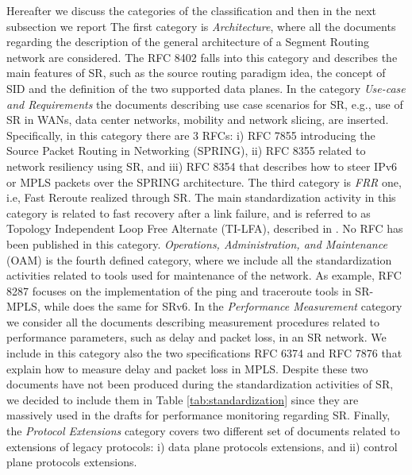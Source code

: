Hereafter we discuss the categories of the classification and then in the next subsection we report 
The first category is \textit{Architecture}, where all the documents regarding the description of the general architecture of a Segment Routing network are considered. The RFC 8402 \cite{rfc8402} falls into this category and describes the main features of SR, such as the source routing paradigm idea, the concept of SID and the definition of the two supported data planes.
In the category \textit{Use-case and Requirements} the documents describing use case scenarios for SR, e.g., use of SR in WANs, data center networks, mobility and network slicing, are inserted. Specifically, in this category there are 3 RFCs: i) RFC 7855 \cite{rfc7855} introducing the Source Packet Routing in Networking (SPRING), ii) RFC 8355 \cite{rfc8355} related to network resiliency using SR, and iii) RFC 8354 \cite{rfc8354} that describes how to steer IPv6 or MPLS packets over the SPRING architecture.
The third category is \textit{FRR} one, i.e, Fast Reroute realized through SR. The main standardization activity in this category is related to fast recovery after a link failure, and is referred to as Topology Independent Loop Free Alternate (TI-LFA), described in \cite{id-segment-routing-ti-lfa}. No RFC has been published in this category.
\textit{Operations, Administration, and Maintenance} (OAM) is the fourth defined category, where we include all the standardization activities related to tools used for maintenance of the network. As example, RFC 8287 \cite{rfc8287} focuses on the implementation of the ping and traceroute tools in SR-MPLS, while \cite{id-srv6-oam} does the same for SRv6.
In the \textit{Performance Measurement} category we consider all the documents describing measurement procedures related to performance parameters, such as delay and packet loss, in an SR network. We include in this category also the two specifications RFC 6374 \cite{rfc6374} and RFC 7876 \cite{rfc7876} that explain how to measure delay and packet loss in MPLS. Despite these two documents have not been produced during the standardization activities of SR, we decided to include them in Table \ref{tab:standardization} since they are massively used in the drafts for performance monitoring regarding SR.
Finally, the \textit{Protocol Extensions} category covers two different set of documents related to extensions of legacy protocols: i) data plane protocols extensions, and ii) control plane protocols extensions.
